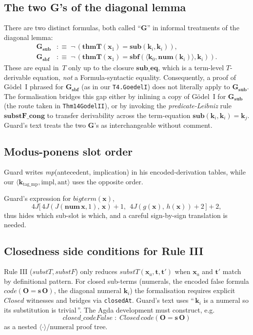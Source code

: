 \documentclass[11pt]{article}
\theoremstyle{plain}
\theoremstyle{definition}
\theoremstyle{remark}
\newcommand{\code}[1]{\mathit{code}(#1)}
\newcommand{\sub}{\mathbf{sub}}
\newcommand{\sbf}{\mathbf{sbf}}
\newcommand{\thmT}{\mathbf{thmT}}
\newcommand{\num}{\mathbf{num}}
\newcommand{\seq}[1]{\langle #1 \rangle}
\newcommand{\Closed}{\mathit{Closed}}
\newcommand{\substT}{\mathit{substT}}
\newcommand{\substF}{\mathit{substF}}
\begin{document}
\subsection{The two G's of the diagonal lemma}

There are two distinct formulas, both called ``$\mathbf{G}$'' in
informal treatments of the diagonal lemma:
\begin{align*}
\mathbf{G}_{\sub}  &:\equiv\; \neg\,(\thmT(\mathbf{x}_1) = \sub(\mathbf{k}_i, \mathbf{k}_i)), \\
\mathbf{G}_{\sbf}  &:\equiv\; \neg\,(\thmT(\mathbf{x}_1) = \sbf(\seq{\mathbf{k}_0, \num(\mathbf{k}_i)}, \mathbf{k}_i)).
\end{align*}
These are equal in~$T$ only up to the closure $\mathbf{sub\_eq}$,
which is a term-level $T$-derivable equation, \emph{not} a
Formula-syntactic equality.  Consequently, a proof of G\"odel~I phrased
for $\mathbf{G}_{\sbf}$ (as in our \verb|T4.GoedelI|) does not
literally apply to $\mathbf{G}_{\sub}$.  The formalisation bridges this
gap either by inlining a copy of G\"odel~I for $\mathbf{G}_{\sub}$ (the
route taken in \verb|Thm14GodelII|), or by invoking the
\emph{predicate-Leibniz} rule $\mathbf{substF\_cong}$ to transfer
derivability across the term-equation $\sub(\mathbf{k}_i, \mathbf{k}_i)
= \mathbf{k}_j$.  Guard's text treats the two $\mathbf{G}$'s as
interchangeable without comment.

\subsection{Modus-ponens slot order}

{\sloppy Guard writes \emph{mp}(antecedent, implication) in
his encoded-derivation tables, while our
$\seq{\mathbf{k}_{\mathrm{tag\_mp}}, \mathrm{impl}, \mathrm{ant}}$ uses
the opposite order.\par}  Guard's expression for
$\mathit{bigterm}(\mathbf{x})$,
\[
4J\bigl[\,4J(J(\num\,\mathbf{x},1),\, \mathbf{x})+1,\ \ 4J(g(\mathbf{x}),\, h(\mathbf{x}))+2\,\bigr]+2,
\]
thus hides which sub-slot is which, and a careful sign-by-sign
translation is needed.

\subsection{Closedness side conditions for Rule III}

Rule III ($\substT, \substF$) only reduces $\substT(\mathbf{x}_a,
\mathbf{t}, \mathbf{t}')$ when $\mathbf{x}_a$ and $\mathbf{t}'$ match
by definitional pattern.  For closed sub-terms (numerals, the encoded
false formula $\code{\mathbf{O} = \mathbf{s}\,\mathbf{O}}$, the
diagonal numeral $\mathbf{k}_i$) the formalisation requires explicit
$\Closed$ witnesses and bridges via \texttt{closedAt}.  Guard's text
uses ``\,$\mathbf{k}_i$ is a numeral so its substitution is
trivial\,''.  The Agda development must construct, e.g.\
\[
\mathit{closed\_codeFalse} \;:\; \Closed\,\code{\mathbf{O} = \mathbf{s}\,\mathbf{O}}
\]
as a nested $\seq{\cdot}$/numeral proof tree.
\end{document}
